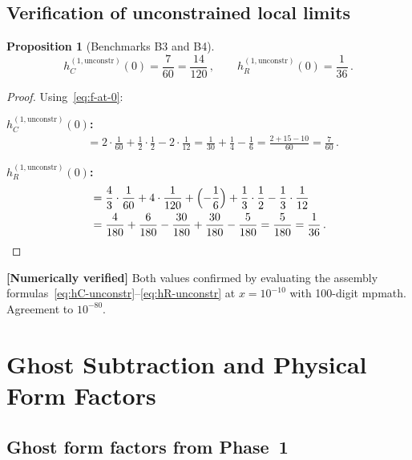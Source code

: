 \documentclass[11pt,a4paper]{article}
\newtheorem{proposition}[theorem]{Proposition}
\theoremstyle{definition}
\theoremstyle{remark}
\newcommand{\verified}[1]{%
  \par\noindent\colorbox{green!10}{%
    \parbox{\dimexpr\linewidth-2\fboxsep}{%
      \textcolor{green!50!black}{\textbf{[Numerically verified]}}
      \textcolor{green!50!black}{#1}%
    }%
  }\par%
}
\begin{document}
\subsection{Verification of unconstrained local limits}

\begin{proposition}[Benchmarks B3 and B4]
\label{prop:B3B4}
\begin{equation}
  \boxed{
  h_C^{(1,\mathrm{unconstr})}(0) = \frac{7}{60}
  = \frac{14}{120}\,,\qquad
  h_R^{(1,\mathrm{unconstr})}(0) = \frac{1}{36}\,.
  }
  \label{eq:unconstr-limits}
\end{equation}
\end{proposition}

\begin{proof}
Using~\eqref{eq:f-at-0}:

\medskip\noindent
\textbf{$h_C^{(1,\mathrm{unconstr})}(0)$:}
\begin{align*}
  &= 2\cdot\frac{1}{60} + \frac{1}{2}\cdot\frac{1}{2}
    - 2\cdot\frac{1}{12}
  = \frac{1}{30} + \frac{1}{4} - \frac{1}{6}
  = \frac{2 + 15 - 10}{60} = \frac{7}{60}\,.
\end{align*}

\medskip\noindent
\textbf{$h_R^{(1,\mathrm{unconstr})}(0)$:}
\begin{align*}
  &= \frac{4}{3}\cdot\frac{1}{60} + 4\cdot\frac{1}{120}
  + \Bigl(-\frac{1}{6}\Bigr)
  + \frac{1}{3}\cdot\frac{1}{2}
  - \frac{1}{3}\cdot\frac{1}{12}\\
  &= \frac{4}{180} + \frac{6}{180} - \frac{30}{180}
  + \frac{30}{180} - \frac{5}{180}
  = \frac{5}{180} = \frac{1}{36}\,.
\end{align*}
\end{proof}

\verified{Both values confirmed by evaluating the assembly
formulas~\eqref{eq:hC-unconstr}--\eqref{eq:hR-unconstr} at $x=10^{-10}$
with 100-digit mpmath.  Agreement to $10^{-80}$.}


\section{Ghost Subtraction and Physical Form Factors}
\label{sec:ghost}

\subsection{Ghost form factors from Phase~1}
\end{document}
